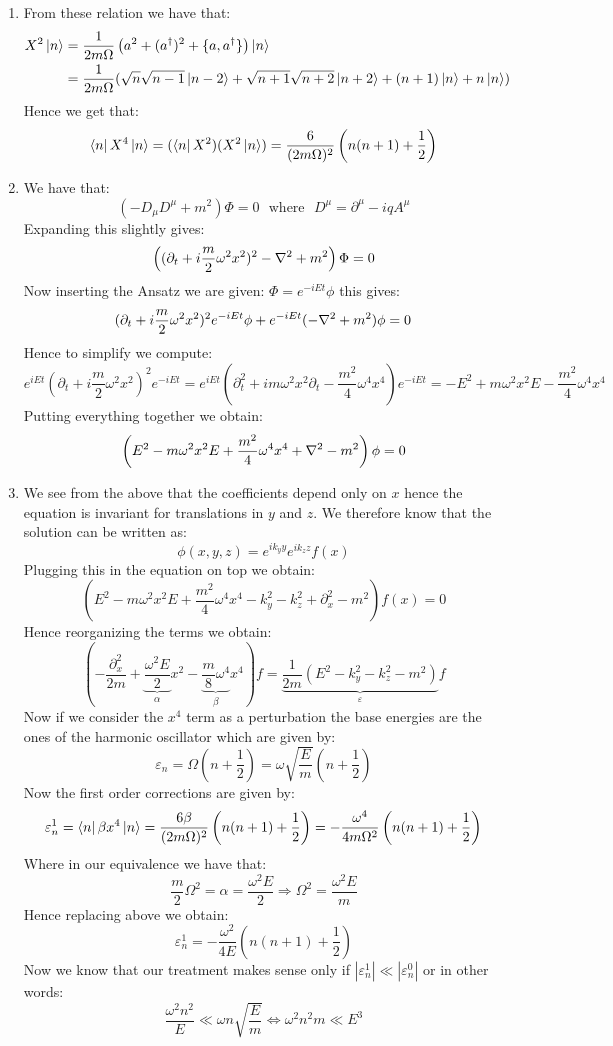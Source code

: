 \documentclass[10pt,a4paper]{article}
\begin{document}
\begin{enumerate}


\item From these relation we have that:
\begin{align*}
X^2 \ket{n} &= \frac{1}{2 m \Omega} \left( a^2 + (a^\dagger)^2 + \{a, a^\dagger\} \right)\ket{n} \\
&= \frac{1}{2m \Omega} (\sqrt{n}\sqrt{n-1} \ket{n-2} + \sqrt{n+1}\sqrt{n+2} \ket{n+2} + (n+1)\ket{n} + n\ket{n})
\end{align*}
Hence we get that:
\[
\bra{n} X^4 \ket{n} = (\bra{n} X^2)(X^2 \ket{n}) = \frac{6}{(2 m \Omega)^2} \left( n(n + 1) + \frac{1}{2} \right) 
\]

\item We have that:
\[
(-D_\mu D^\mu + m^2) \Phi = 0 \mbox{~~where~~} D^\mu = \partial^\mu - i q A^\mu
\]
Expanding this slightly gives:
\[
\left((\partial_t + i \frac{m}{2} \omega^2 x^2)^2 - \laplacian + m^2\right)\Phi = 0
\]
Now inserting the Ansatz we are given: $\Phi = e^{-iEt} \phi$ this gives:
\[
(\partial_t + i \frac{m}{2} \omega^2 x^2)^2 e^{-iE t} \phi +   e^{-iEt} (-\laplacian + m^2) \phi = 0
\]
Hence to simplify we compute:
\[
e^{iEt}(\partial_t + i \frac{m}{2} \omega^2 x^2)^2 e^{-iEt} = e^{iEt}(\partial_t^2 + i m \omega^2 x^2 \partial_t - \frac{m^2}{4} \omega^4 x^4) e^{-i E t} = - E^2 + m \omega^2 x^2 E - \frac{m^2}{4} \omega^4 x^4
\]
Putting everything together we obtain:
\[
\left( E^2 - m\omega^2 x^2 E + \frac{m^2}{4} \omega^4 x^4 + \laplacian - m^2 \right) \phi = 0
\]

\item We see from the above that the coefficients depend only on $x$ hence the equation is invariant for translations in $y$ and $z$. We therefore know that the solution can be written as:
\[
\phi(x, y, z) = e^{i k_y y} e^{i k_z z} f(x) 
\]
Plugging this in the equation on top we obtain:
\[
\left( E^2 - m \omega^2 x^2 E + \frac{m^2}{4} \omega^4 x^4 - k_y^2 - k_z^2 + \partial_x^2 - m^2 \right) f(x) = 0
\]
Hence reorganizing the terms we obtain:
\[
\left(-\frac{\partial_x^2}{2m} + \underbrace{\frac{\omega^2 E}{2}}_{\alpha} x^2 - \underbrace{\frac{m}{8} \omega^4}_{\beta} x^4 \right)f = \underbrace{\frac{1}{2m}\left(E^2 - k_y^2 - k_z^2 - m^2\right)}_{\varepsilon} f 
\]
Now if we consider the $x^4$ term as a perturbation the base energies are the ones of the harmonic oscillator which are given by:
\[
\varepsilon_n =  \Omega \left( n + \frac{1}{2} \right) = \omega \sqrt{\frac{E}{m}}\left(n + \frac{1}{2}\right)
\]
Now the first order corrections are given by:
\[
\varepsilon_n^1 = \bra{n} \beta x^4 \ket{n} = \frac{6 \beta}{(2 m \Omega)^2} \left( n(n + 1) + \frac{1}{2} \right)  = -\frac{ \omega^4 }{4 m \Omega^2} \left( n(n + 1) + \frac{1}{2} \right)
\]
Where in our equivalence we have that:
\[
\frac{m}{2}\Omega^2 = \alpha = \frac{\omega^2 E}{2} \Rightarrow \Omega^2 = \frac{\omega^2 E }{m} 
\]
Hence replacing above we obtain:
\[
\varepsilon_n^1 = -\frac{\omega^2}{4 E} \left( n(n + 1) + \frac{1}{2} \right)
\]
Now we know that our treatment makes sense only if $|\varepsilon_n^1| \ll |\varepsilon_n^0|$ or in other words:
\[
\frac{\omega^2 n^2}{E} \ll \omega n \sqrt{\frac{E}{m}} \Leftrightarrow \omega^2 n^2 m \ll E^3 
\]


\end{enumerate}
\end{document}
